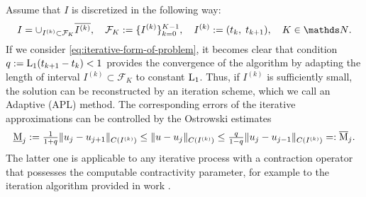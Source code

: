 Assume that $I$ is discretized in the following way:
%
\begin{equation}
I = \cup_{ I^{(k)} \subset \mathcal{F}_K } \overline{I^{(k)}}, \quad 
\mathcal{F}_K := \{I^{(k)}\}_{k = 0}^{K-1}, 
\quad I^{(k)} := (t_k,\;t_{k+1}), 
\quad K \in \Nd.
\label{eq:F-K}  
\end{equation}
%
If we consider \eqref{eq:iterative-form-of-problem}, it becomes clear that condition 
$q := \mathrm{L}_1(t_{k+1} - t_k) < 1$
%
provides the convergence of the algorithm by adapting the length of interval \linebreak
$I^{(k)} \subset \mathcal{F}_K$ to constant $\mathrm{L}_1$. Thus, if $I^{(k)}$ is 
sufficiently small, the solution can be reconstructed by an iteration scheme, which we 
call an Adaptive \PL \linebreak(APL) method. The corresponding errors of the iterative 
approximations can be controlled by the Ostrowski estimates
%
\begin{equation*}
	\mij{j} := \tfrac{1}{1+q} \|u_j - u_{j + 1}\|_{C(I^{(k)})} \leq \|u - u_j\|_{C(I^{(k)})}
	\leq \tfrac{q}{1-q} \|u_j - u_{j - 1}\|_{C(I^{(k)})} =: \maj{j}.
\end{equation*}
%
The latter one is applicable to any iterative process with a contraction operator
that possesses the computable contractivity parameter, for example to the iteration 
algorithm provided in work \cite{GiraultKumarWheeler2015}.

